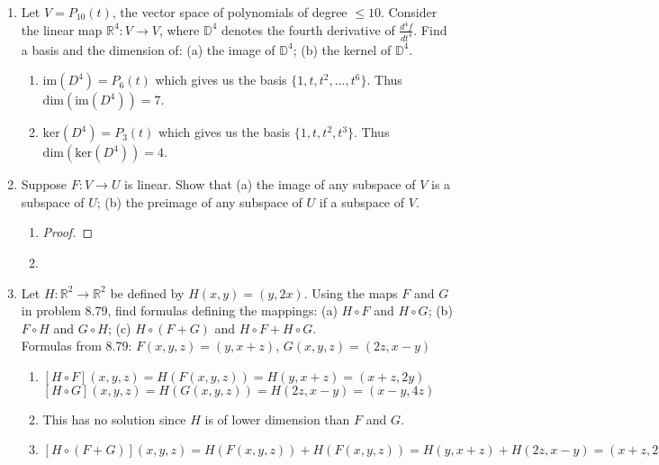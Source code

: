 \documentclass[12pt]{article}
\theoremstyle{definition}
\theoremstyle{plain}
\begin{document}
\begin{enumerate}
\item[8.75] Let $V=P_{10}(t)$, the vector space of polynomials of degree $\leq 10$. Consider the linear map $\mathbb{R}^4: V\rightarrow V$, where $\mathbb{D}^4$ denotes the fourth derivative of $\frac{d^4f}{dt^4}$. Find a basis and the dimension of: (a) the image of $\mathbb{D}^4$; (b) the kernel of $\mathbb{D}^4$.
	\begin{enumerate}
	\item $\mathrm{im}(D^4) = P_6(t)$ which gives us the basis $\{1,t,t^2,...,t^6\}$. Thus $\mathrm{dim}(\mathrm{im}(D^4))=7$.
	\item $\mathrm{ker}(D^4)=P_3(t)$ which gives us the basis $\{1,t,t^2,t^3\}$. Thus $\mathrm{dim}(\mathrm{ker}(D^4))=4$.
	\end{enumerate}		

\item[8.76] Suppose $F:V\rightarrow U$ is linear. Show that (a) the image of any subspace of $V$ is a subspace of $U$; (b) the preimage of any subspace of $U$ if a subspace of $V$.
	\begin{enumerate}
	\item
	\begin{proof}
	
	\end{proof}
	\item
	\end{enumerate}

\item[8.80] Let $H:\mathbb{R}^2\rightarrow\mathbb{R}^2$ be defined by $H(x,y)=(y,2x)$. Using the maps $F$ and $G$ in problem 8.79, find formulas defining the mappings: (a) $H\circ F$ and $H\circ G$; (b) $F\circ H$ and $G\circ H$; (c) $H\circ(F+G)$ and $H\circ F + H\circ G$.\\
Formulas from 8.79: $F(x,y,z)=(y,x+z)$, $G(x,y,z)=(2z,x-y)$
	\begin{enumerate}
	\item $[H \circ F](x,y,z)=H(F(x,y,z)) = H(y,x+z) = (x+z,2y)$\\
	$[H \circ G](x,y,z)=H(G(x,y,z)) = H(2z,x-y) = (x-y,4z)$
	\item This has no solution since $H$ is of lower dimension than $F$ and $G$.
	\item $[H \circ (F+G)](x,y,z) = H(F(x,y,z)) + H(F(x,y,z)) = H(y,x+z)+H(2z,x-y) = (x+z,2y)+(x-y,4z) = (2x-y+z,2y+4z)$
	\end{enumerate}
	

\end{enumerate}
\end{document}

